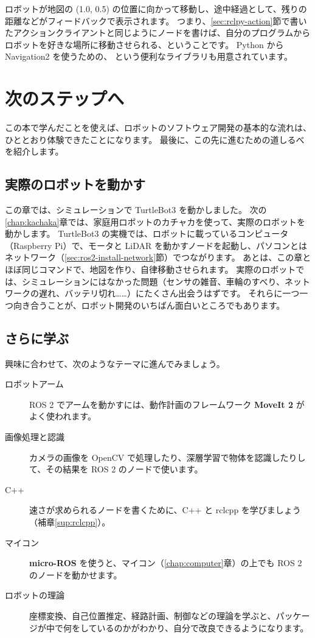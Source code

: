 ロボットが地図の (1.0, 0.5) の位置に向かって移動し、途中経過として、残りの距離などがフィードバックで表示されます。
つまり、\ref{sec:rclpy-action}節で書いたアクションクライアントと同じようにノードを書けば、自分のプログラムからロボットを好きな場所に移動させられる、ということです。
Python から Navigation2 を使うための、 という便利なライブラリも用意されています。

\section{次のステップへ}
\label{sec:practice-next}

この本で学んだことを使えば、ロボットのソフトウェア開発の基本的な流れは、ひととおり体験できたことになります。
最後に、この先に進むための道しるべを紹介します。

\subsection{実際のロボットを動かす}

この章では、シミュレーションで TurtleBot3 を動かしました。
次の\ref{chap:kachaka}章では、家庭用ロボットのカチャカを使って、実際のロボットを動かします。
TurtleBot3 の実機では、ロボットに載っているコンピュータ（Raspberry Pi）で、モータと LiDAR を動かすノードを起動し、パソコンとはネットワーク（\ref{sec:ros2-install-network}節）でつながります。
あとは、この章とほぼ同じコマンドで、地図を作り、自律移動させられます。
実際のロボットでは、シミュレーションにはなかった問題（センサの雑音、車輪のすべり、ネットワークの遅れ、バッテリ切れ……）にたくさん出会うはずです。
それらに一つ一つ向き合うことが、ロボット開発のいちばん面白いところでもあります。

\subsection{さらに学ぶ}

興味に合わせて、次のようなテーマに進んでみましょう。

\begin{description}
  \item[ロボットアーム] ROS 2 でアームを動かすには、動作計画のフレームワーク \textbf{MoveIt 2} がよく使われます。
  \item[画像処理と認識] カメラの画像を OpenCV で処理したり、深層学習で物体を認識したりして、その結果を ROS 2 のノードで使います。
  \item[C++] 速さが求められるノードを書くために、C++ と rclcpp を学びましょう（補章\ref{sup:rclcpp}）。
  \item[マイコン] \textbf{micro-ROS} を使うと、マイコン（\ref{chap:computer}章）の上でも ROS 2 のノードを動かせます。
  \item[ロボットの理論] 座標変換、自己位置推定、経路計画、制御などの理論を学ぶと、パッケージが中で何をしているのかがわかり、自分で改良できるようになります。
\end{description}

